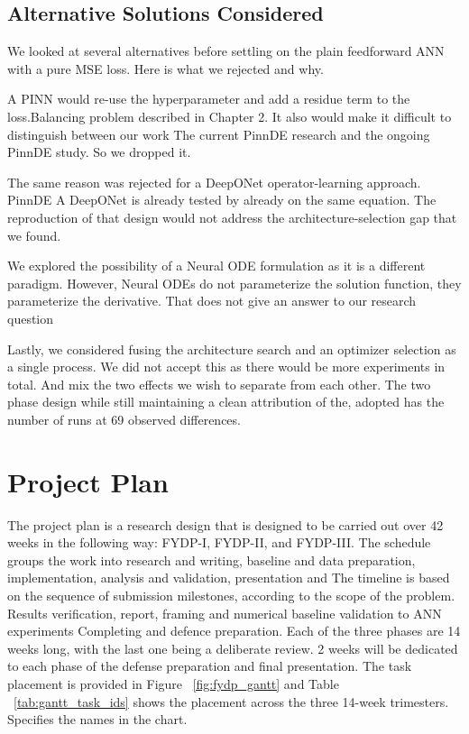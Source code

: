\subsection{Alternative Solutions Considered}

We looked at several alternatives before settling on the plain feedforward ANN with a pure MSE loss. Here is what we rejected and why.

A PINN would re-use the hyperparameter and add a residue term to the loss.Balancing problem described in Chapter 2. It also would make it difficult to distinguish between our work The current PinnDE research and the ongoing PinnDE study. So we dropped it.

The same reason was rejected for a DeepONet operator-learning approach. PinnDE
A DeepONet is already tested by already on the same equation. The reproduction of that design would not address the architecture-selection gap that we found.


We explored the possibility of a Neural ODE formulation as it is a different paradigm. However, Neural ODEs do not parameterize the solution function, they parameterize the derivative. That does not give an answer to our research question

Lastly, we considered fusing the architecture search and an optimizer selection as a single process. We did not accept this as there would be more experiments in total. And mix the two effects we wish to separate from each other. The two phase design while still maintaining a clean attribution of the, adopted has the number of runs at 69 observed differences.

\section{Project Plan}

The project plan is a research design that is designed to be carried out over 42 weeks in the following way: FYDP-I, FYDP-II, and FYDP-III. The schedule groups the work into research and writing, baseline and data preparation, implementation, analysis and validation, presentation and The timeline is based on the sequence of submission milestones, according to the scope of the problem. Results verification, report, framing and numerical baseline validation to ANN experiments Completing and defence preparation. Each of the three phases are 14 weeks long, with the last one being a deliberate review. 2 weeks will be dedicated to each phase of the defense preparation and final presentation. The task placement is provided in Figure ~\ref{fig:fydp_gantt} and Table ~\ref{tab:gantt_task_ids} shows the placement across the three 14-week trimesters. Specifies the names in the chart.


